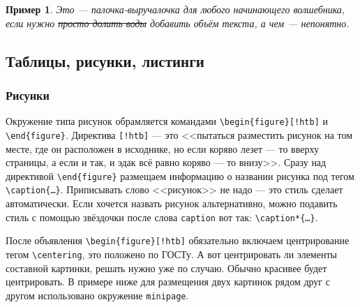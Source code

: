 \documentclass[14pt,russian]{scrartcl}
\newcounter{cExample}
\newtheorem{Example}{Пример}[cExample]
\begin{document}
\begin{Example}
Это --- палочка-выручалочка для любого начинающего волшебника, если нужно \sout{просто долить воды} добавить объём текста, а чем --- непонятно. 
\end{Example}

\subsection{Таблицы, рисунки, листинги}

\subsubsection{Рисунки}

Окружение типа рисунок обрамляется командами \texttt{\textbackslash begin\{figure\}[!htb]} и \texttt{\textbackslash end\{figure\}}. Директива \texttt{[!htb]} --- это <<пытаться разместить рисунок на том месте, где он расположен в исходнике, но если коряво лезет --- то вверху страницы, а если и так, и эдак всё равно коряво --- то внизу>>. Сразу над директивой \texttt{\textbackslash end\{figure\}} размещаем информацию о названии рисунка под тегом \texttt{\textbackslash{caption}\{\dots\}}. Приписывать слово <<рисунок>> не надо --- это стиль сделает автоматически. Если хочется назвать рисунок альтернативно, можно подавить стиль с помощью звёздочки после слова \texttt{caption} вот так: \texttt{\textbackslash{caption*}\{\dots\}}.

После объявления \texttt{\textbackslash begin\{figure\}[!htb]} обязательно включаем центрирование тегом \texttt{\textbackslash centering}, это положено по ГОСТу. А вот центрировать ли элементы составной картинки, решать нужно уже по случаю. Обычно красивее будет центрировать. В примере ниже для размещения двух картинок рядом друг с другом использовано окружение \texttt{minipage}. 
\end{document}
